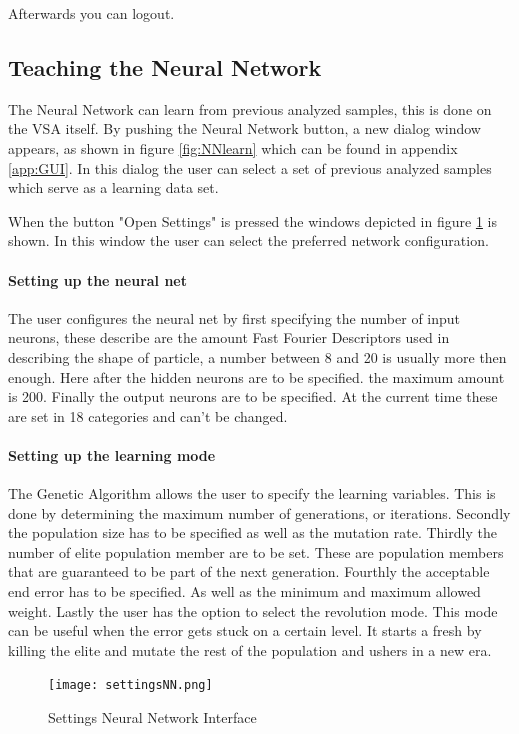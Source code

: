 \documentclass[11pt,fleqn,,a4paper,twoside,openright]{book}
\begin{document}
Afterwards you can logout.

\subsection{Teaching the Neural Network}
The Neural Network can learn from previous analyzed samples, this is done on the VSA itself. By pushing the Neural Network button, a new dialog window appears, as shown in figure \ref{fig:NNlearn} which can be found in appendix \ref{app:GUI}.  In this dialog the user can select a set of previous analyzed samples which serve as a learning data set.

When the button "Open Settings" is pressed the windows depicted in figure \ref{fig:NNsettings} is shown. In this window the user can select the preferred network configuration. 
\paragraph{Setting up the neural net}
The user configures the neural net by first specifying the number of input neurons, these describe are the amount Fast Fourier Descriptors used in describing the shape of particle, a number between 8 and 20 is usually more then enough. Here after the hidden neurons are to be specified. the maximum amount is 200. Finally the output neurons are to be specified. At the current time these are set in 18 categories and can't be changed.

\paragraph{Setting up the learning mode}
The Genetic Algorithm allows the user to specify the learning variables. This is done by determining the maximum number of generations, or iterations. Secondly the population size has to be specified as well as the mutation rate. Thirdly the number of elite population member are to be set. These are population members that are guaranteed to be part of the next generation. Fourthly the acceptable end error has to be specified. As well as the minimum and maximum allowed weight. Lastly the user has the option to select the revolution mode. This mode can be useful when the error gets stuck on a certain level. It starts a fresh by killing the elite and mutate the rest of the population and ushers in a new era.

\begin{figure}[h]
	\texttt{[image: settingsNN.png]}
	\caption{Settings Neural Network Interface}\label{fig:NNsettings}
\end{figure}
\end{document}
